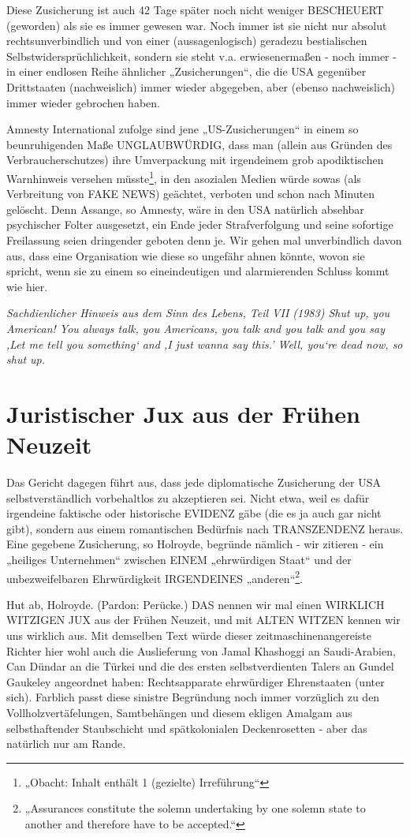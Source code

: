 \begin{multicols}{2}
Diese Zusicherung ist auch 42 Tage später noch nicht
weniger BESCHEUERT (geworden) als sie es immer gewesen war. Noch immer ist sie nicht nur absolut rechtsunverbindlich und von einer (aussagenlogisch) geradezu bestialischen Selbstwidersprüchlichkeit, sondern
sie steht v.a. erwiesenermaßen - noch immer - in einer
endlosen Reihe ähnlicher „Zusicherungen“, die die USA
gegenüber Drittstaaten (nachweislich) immer wieder
abgegeben, aber (ebenso nachweislich) immer wieder
gebrochen haben.

Amnesty International zufolge sind jene „US-Zusicherungen“ in einem so beunruhigenden Maße UNGLAUBWÜRDIG, dass man (allein aus Gründen des Verbraucherschutzes) ihre Umverpackung mit irgendeinem
grob apodiktischen Warnhinweis versehen müsste\footnote[31]{„Obacht: Inhalt enthält 1 (gezielte) Irreführung“}, in
den asozialen Medien würde sowas (als Verbreitung von
FAKE NEWS) geächtet, verboten und schon nach Minuten gelöscht. Denn Assange, so Amnesty, wäre in den
USA natürlich absehbar psychischer Folter ausgesetzt,
ein Ende jeder Strafverfolgung und seine sofortige Freilassung seien dringender geboten denn je. Wir gehen
mal unverbindlich davon aus, dass eine Organisation
wie diese so ungefähr ahnen könnte, wovon sie spricht,
wenn sie zu einem so eineindeutigen und alarmierenden Schluss kommt wie hier.

\textit{Sachdienlicher Hinweis aus dem Sinn des Lebens, Teil VII (1983)
Shut up, you American! You always talk, you Americans, you talk and you talk and you say 
‚Let me tell you something‘ and ‚I just wanna say this.’ Well, you‘re dead now, so shut up.}


\section{Juristischer Jux aus der Frühen Neuzeit}
Das Gericht dagegen führt aus, dass jede diplomatische
Zusicherung der USA selbstverständlich vorbehaltlos zu
akzeptieren sei. Nicht etwa, weil es dafür irgendeine faktische oder historische EVIDENZ gäbe (die es ja auch gar
nicht gibt), sondern aus einem romantischen Bedürfnis
nach TRANSZENDENZ heraus. Eine gegebene Zusicherung, so Holroyde, begründe nämlich - wir zitieren - ein
„heiliges Unternehmen“ zwischen EINEM „ehrwürdigen Staat“ und der unbezweifelbaren Ehrwürdigkeit 
IRGENDEINES „anderen“\footnote[32]{„Assurances constitute the solemn undertaking by one solemn state to another and therefore have to be accepted.“}.

Hut ab, Holroyde. (Pardon: Perücke.) DAS nennen wir
mal einen WIRKLICH WITZIGEN JUX aus der Frühen
Neuzeit, und mit ALTEN WITZEN kennen wir uns wirklich aus. Mit demselben Text würde dieser zeitmaschinenangereiste Richter hier wohl auch die Auslieferung
von Jamal Khashoggi an Saudi-Arabien, Can Dündar an
die Türkei und die des ersten selbstverdienten Talers an
Gundel Gaukeley angeordnet haben: Rechtsapparate
ehrwürdiger Ehrenstaaten (unter sich). Farblich passt
diese sinistre Begründung noch immer vorzüglich zu
den Vollholzvertäfelungen, Samtbehängen und diesem
ekligen Amalgam aus selbsthaftender Staubschicht und
spätkolonialen Deckenrosetten - aber das natürlich nur
am Rande.


\end{multicols}
